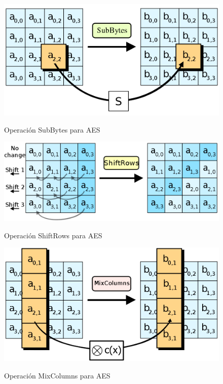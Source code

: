 \begin{figure}[ht]
  \centering
  \includegraphics[scale=0.25]{Figures/SubBytes}
  \decoRule
  \caption[SubBytes (AES)]{Operación SubBytes para AES} \emph{\parencite{Reference27}}
  \label{fig:SubBytes}
\end{figure}

\begin{figure}[ht]
  \centering
  \includegraphics[scale=0.25]{Figures/ShiftRows}
  \decoRule
  \caption[ShiftRows (AES)]{Operación ShiftRows para AES} \emph{\parencite{Reference28}}
  \label{fig:ShiftRows}
\end{figure}

\begin{figure}[ht]
  \centering
  \includegraphics[scale=0.25]{Figures/MixColumns}
  \decoRule
  \caption[MixColumns (AES)]{Operación MixColumns para AES} \emph{\parencite{Reference29}}
  \label{fig:MixColumns}
\end{figure}

